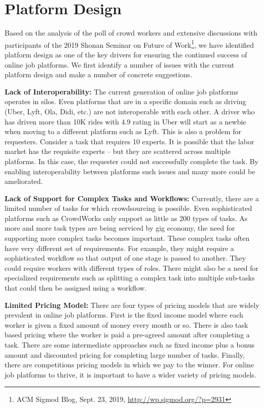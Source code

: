 \section{Platform Design}
\label{sec:platformDesign}

Based on the analysis of the poll of crowd workers
and extensive discussions with participants of the 2019 Shonan Seminar on Future of Work\footnote{ACM Sigmod Blog, Sept. 23, 2019,  \url{http://wp.sigmod.org/?p=2931}},
we have identified platform design as one of the key drivers
for ensuring the continued success of online job platforms.
We first identify a number of issues with the current platform design and make a number of concrete suggestions.

\textbf{Lack of Interoperability:}
The current generation of online job platforms operates in silos.
Even platforms that are in a specific domain such as driving (Uber, Lyft, Ola, Didi, etc.) are not
interoperable with each other.
A driver who has driven more than 10K rides with 4.9 rating in Uber will start
as a newbie when moving to a different platform such as Lyft.
This is also a problem for requesters. Consider a task that requires 10 experts.
It is possible that the labor market has the requisite experts -- but they are scattered across multiple platforms.
In this case, the requester could not successfully complete the task.
By enabling interoperability between platforms such issues and many more could be ameliorated.

\textbf{Lack of Support for Complex Tasks and Workflows:}
Currently, there are a limited number of tasks for which crowdsourcing is possible.
Even sophisticated platforms such as CrowdWorks only support as little as 200 types of tasks.
As more and more task types are being serviced by gig economy,
the need for supporting more complex tasks becomes important.
These complex tasks often have very different set of requirements.
For example, they might require a sophisticated workflow so that output of one stage is passed to another. They could require workers with different types of roles.
There might also be a need for specialized requirements such as splitting
a complex task into multiple sub-tasks that could then be assigned using a workflow.


\textbf{Limited Pricing Model:}
There are four types of pricing  models that are widely prevalent in online job platforms.
First is the fixed income model where each worker is given a fixed amount of money every month or so.
There is also task based pricing where the worker is paid a pre-agreed amount after completing a task.
There are some intermediate approaches such as fixed income plus a bonus amount and discounted pricing for completing large number of tasks.
Finally, there are competitions pricing  models in which we pay to the winner.
For online job platforms to thrive, it is important to have a wider variety of pricing models.

